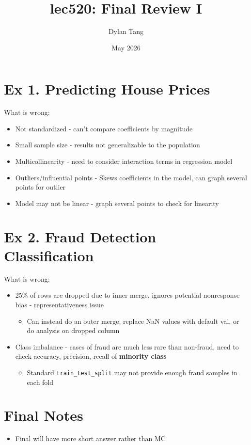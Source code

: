 \documentclass{article}
\title{lec520: Final Review I}
\author{Dylan Tang}
\date{May 2026}
\begin{document}
\maketitle

\section{Ex 1. Predicting House Prices}
What is wrong:
\begin{itemize}
    \item Not standardized - can't compare coefficients by magnitude
    \item Small sample size - results not generalizable to the population
    \item Multicollinearity - need to consider interaction terms in regression model
    \item Outliers/influential points - Skews coefficients in the model, can graph several points for outlier
    \item Model may not be linear - graph several points to check for linearity
\end{itemize}

\section{Ex 2. Fraud Detection Classification}
What is wrong:
\begin{itemize}
    \item 25\% of rows are dropped due to inner merge, ignores potential nonresponse bias - representativeness issue
        \begin{itemize}
            \item Can instead do an outer merge, replace NaN values with default val, or do analysis on dropped column
        \end{itemize}
    \item Class imbalance - cases of fraud are much less rare than non-fraud, need to check accuracy, precision, recall of \textbf{minority class}
        \begin{itemize}
            \item Standard \texttt{train\_test\_split} may not provide enough fraud samples in each fold
        \end{itemize}
\end{itemize}
\section{Final Notes}
\begin{itemize}
    \item Final will have more short answer rather than MC
\end{itemize}
\end{document}
